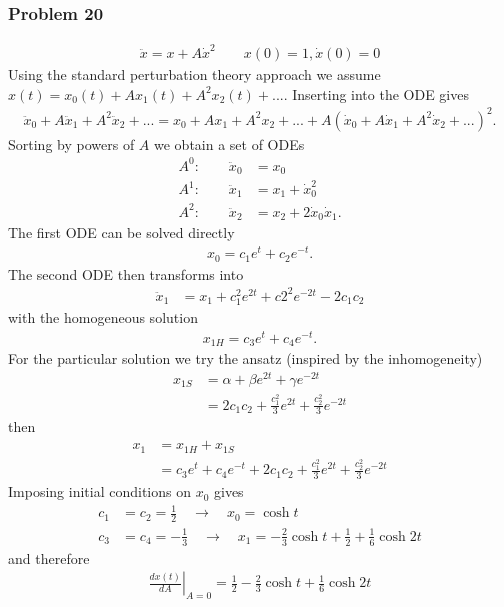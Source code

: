 \documentclass[10pt,a4paper]{book}
\theoremstyle{definition}
\begin{document}
\subsubsection{Problem 20}
\begin{align}
    \ddot{x}=x+A\dot{x}^2\quad\quad x(0)=1, \dot{x}(0)=0
\end{align}
Using the standard perturbation theory approach we assume $x(t)=x_0(t)+Ax_1(t)+A^2x_2(t)+...$. Inserting into the ODE gives 
\begin{align}
    \ddot{x}_0+A\ddot{x}_1+A^2\ddot{x}_2+...=x_0+Ax_1+A^2x_2+...+A\left(\dot{x}_0+A\dot{x}_1+A^2\dot{x}_2+...\right)^2.
\end{align}
Sorting by powers of $A$ we obtain a set of ODEs
\begin{align}
    A^0:\quad\quad\ddot{x}_0&=x_0\\
    A^1:\quad\quad\ddot{x}_1&=x_1+\dot{x}_0^2\\
    A^2:\quad\quad\ddot{x}_2&=x_2+2\dot{x}_0\dot{x}_1.
\end{align}
The first ODE can be solved directly
\begin{align}
    x_0=c_1e^t+c_2e^{-t}.
\end{align}
The second ODE then transforms into
\begin{align}
    \ddot{x}_1&=x_1+c_1^2e^{2t}+c2^2e^{-2t}-2c_1c_2
\end{align}
with the homogeneous solution
\begin{align}
    x_{1H}=c_3e^t+c_4e^{-t}.
\end{align}
For the particular solution we try the ansatz (inspired by the inhomogeneity) 
\begin{align}
    x_{1S}&=\alpha+\beta e^{2t}+\gamma e^{-2t}\\
    &=2c_1c_2+\frac{c_1^2}{3}e^{2t}+\frac{c_2^2}{3}e^{-2t}
\end{align}
then
\begin{align}
x_1&=x_{1H}+x_{1S}\\
&=c_3e^t+c_4e^{-t}+2c_1c_2+\frac{c_1^2}{3}e^{2t}+\frac{c_2^2}{3}e^{-2t}
\end{align}
Imposing initial conditions on $x_0$ gives
\begin{align}
    c_1&=c_2=\frac{1}{2}\quad\rightarrow\quad x_0=\cosh t\\
    c_3&=c_4=-\frac{1}{3}\quad\rightarrow\quad x_1=-\frac{2}{3}\cosh t+\frac{1}{2}+\frac{1}{6}\cosh 2t
\end{align}
and therefore
\begin{align}
    \left.\frac{dx(t)}{dA}\right|_{A=0}=\frac{1}{2}-\frac{2}{3}\cosh t+\frac{1}{6}\cosh 2t
\end{align}
\end{document}
